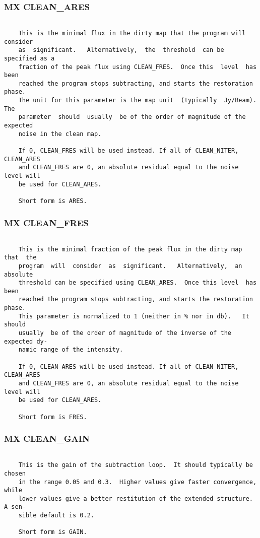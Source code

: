 \subsubsection{MX CLEAN\_ARES}
\begin{verbatim}

    This is the minimal flux in the dirty map that the program will consider
    as  significant.   Alternatively,  the  threshold  can be specified as a
    fraction of the peak flux using CLEAN_FRES.  Once this  level  has  been
    reached the program stops subtracting, and starts the restoration phase.
    The unit for this parameter is the map unit  (typically  Jy/Beam).   The
    parameter  should  usually  be of the order of magnitude of the expected
    noise in the clean map.

    If 0, CLEAN_FRES will be used instead. If all of CLEAN_NITER, CLEAN_ARES
    and CLEAN_FRES are 0, an absolute residual equal to the noise level will
    be used for CLEAN_ARES.

    Short form is ARES.

\end{verbatim}
\subsubsection{MX CLEAN\_FRES}
\begin{verbatim}

    This is the minimal fraction of the peak flux in the dirty map that  the
    program  will  consider  as  significant.   Alternatively,  an  absolute
    threshold can be specified using CLEAN_ARES.  Once this level  has  been
    reached the program stops subtracting, and starts the restoration phase.
    This parameter is normalized to 1 (neither in % nor in db).   It  should
    usually  be of the order of magnitude of the inverse of the expected dy-
    namic range of the intensity.

    If 0, CLEAN_ARES will be used instead. If all of CLEAN_NITER, CLEAN_ARES
    and CLEAN_FRES are 0, an absolute residual equal to the noise level will
    be used for CLEAN_ARES.

    Short form is FRES.

\end{verbatim}
\subsubsection{MX CLEAN\_GAIN}
\begin{verbatim}

    This is the gain of the subtraction loop.  It should typically be chosen
    in the range 0.05 and 0.3.  Higher values give faster convergence, while
    lower values give a better restitution of the extended structure. A sen-
    sible default is 0.2.

    Short form is GAIN.

\end{verbatim}
